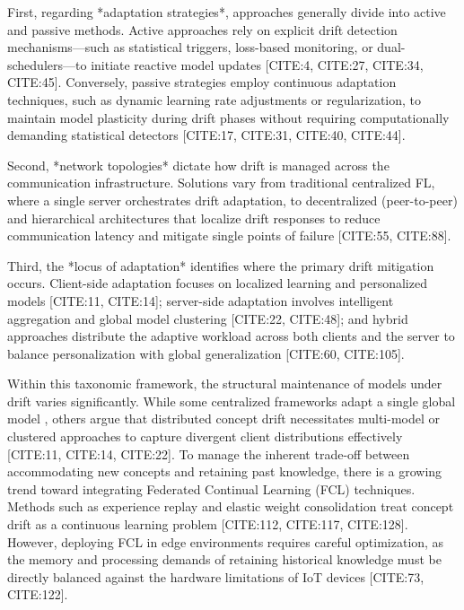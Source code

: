 \documentclass[journal]{IEEEtran}
\begin{document}
First, regarding *adaptation strategies*, approaches generally divide into active and passive methods. Active approaches rely on explicit drift detection mechanisms—such as statistical triggers, loss-based monitoring, or dual-schedulers—to initiate reactive model updates [CITE:4, CITE:27, CITE:34, CITE:45]. Conversely, passive strategies employ continuous adaptation techniques, such as dynamic learning rate adjustments or regularization, to maintain model plasticity during drift phases without requiring computationally demanding statistical detectors [CITE:17, CITE:31, CITE:40, CITE:44]. 

Second, *network topologies* dictate how drift is managed across the communication infrastructure. Solutions vary from traditional centralized FL, where a single server orchestrates drift adaptation, to decentralized (peer-to-peer) and hierarchical architectures that localize drift responses to reduce communication latency and mitigate single points of failure [CITE:55, CITE:88]. 

Third, the *locus of adaptation* identifies where the primary drift mitigation occurs. Client-side adaptation focuses on localized learning and personalized models [CITE:11, CITE:14]; server-side adaptation involves intelligent aggregation and global model clustering [CITE:22, CITE:48]; and hybrid approaches distribute the adaptive workload across both clients and the server to balance personalization with global generalization [CITE:60, CITE:105].

Within this taxonomic framework, the structural maintenance of models under drift varies significantly. While some centralized frameworks adapt a single global model \cite{Casado2021}, others argue that distributed concept drift necessitates multi-model or clustered approaches to capture divergent client distributions effectively [CITE:11, CITE:14, CITE:22]. To manage the inherent trade-off between accommodating new concepts and retaining past knowledge, there is a growing trend toward integrating Federated Continual Learning (FCL) techniques. Methods such as experience replay and elastic weight consolidation treat concept drift as a continuous learning problem [CITE:112, CITE:117, CITE:128]. However, deploying FCL in edge environments requires careful optimization, as the memory and processing demands of retaining historical knowledge must be directly balanced against the hardware limitations of IoT devices [CITE:73, CITE:122].
\end{document}
